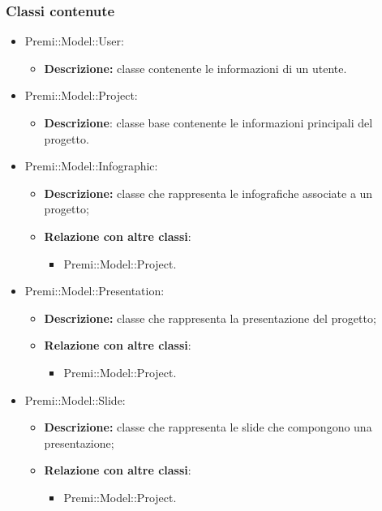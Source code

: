 	\subsubsection*{Classi contenute}
	\begin{itemize}
		\item Premi::Model::User:
		\begin{itemize}
			\item \textbf{Descrizione:} classe contenente le informazioni di un utente.
		\end{itemize}
		\item Premi::Model::Project:
		\begin{itemize}
			\item \textbf{Descrizione}: classe base contenente le informazioni principali del progetto.
		\end{itemize}
			
		\item Premi::Model::Infographic:
		\begin{itemize}
			\item \textbf{Descrizione:} classe che rappresenta le infografiche associate a un progetto;
			\item \textbf{Relazione con altre classi}:
			\begin{itemize}
				\item Premi::Model::Project.
			\end{itemize}
		\end{itemize}
		
		\item Premi::Model::Presentation:
		\begin{itemize}
			\item \textbf{Descrizione:} classe che rappresenta la presentazione del progetto;
			\item \textbf{Relazione con altre classi}:
			\begin{itemize}
				\item Premi::Model::Project.
			\end{itemize}
		\end{itemize}
		
		\item Premi::Model::Slide:
		\begin{itemize}
			\item \textbf{Descrizione:} classe che rappresenta le \gls{slide} che compongono una presentazione;
			\item \textbf{Relazione con altre classi}:
			\begin{itemize}
				\item Premi::Model::Project.
			\end{itemize}
		\end{itemize}
		

\end{itemize}

